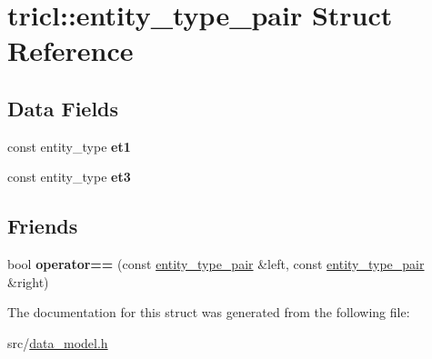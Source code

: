 \hypertarget{structtricl_1_1entity__type__pair}{}\section{tricl\+:\+:entity\+\_\+type\+\_\+pair Struct Reference}
\label{structtricl_1_1entity__type__pair}
\subsection*{Data Fields}
\begin{DoxyCompactItemize}
\item 
\mbox{\label{structtricl_1_1entity__type__pair_a8ac4e6ba084913026bf261240ff4c062}} 
const entity\+\_\+type {\bfseries et1}
\item 
\mbox{\label{structtricl_1_1entity__type__pair_a677ea5a09e9a0d0dc03680d5be3afacd}} 
const entity\+\_\+type {\bfseries et3}
\end{DoxyCompactItemize}
\subsection*{Friends}
\begin{DoxyCompactItemize}
\item 
\mbox{\label{structtricl_1_1entity__type__pair_ab148ef41047fcbd537a8f98b11e11045}} 
bool {\bfseries operator==} (const \hyperlink{structtricl_1_1entity__type__pair}{entity\+\_\+type\+\_\+pair} \&left, const \hyperlink{structtricl_1_1entity__type__pair}{entity\+\_\+type\+\_\+pair} \&right)
\end{DoxyCompactItemize}


The documentation for this struct was generated from the following file\+:\begin{DoxyCompactItemize}
\item 
src/\hyperlink{data__model_8h}{data\+\_\+model.\+h}\end{DoxyCompactItemize}
